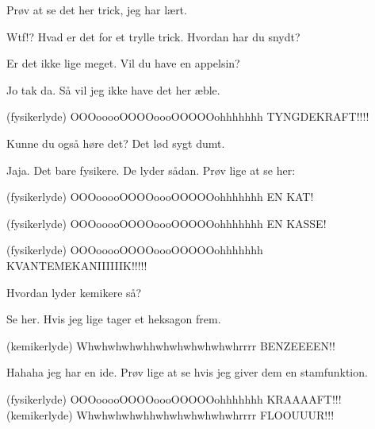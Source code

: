 \documentclass[a4paper,11pt]{article}
\begin{document}
\begin{sketch}


 Prøv at se det her trick, jeg har lært.


 Wtf!? Hvad er det for et trylle trick. Hvordan har du snydt?

 Er det ikke lige meget. Vil du have en appelsin?

 Jo tak da. Så vil jeg ikke have det her æble.


 (fysikerlyde) OOOooooOOOOoooOOOOOohhhhhhh TYNGDEKRAFT!!!!

 Kunne du også høre det? Det lød sygt dumt.

 Jaja. Det bare fysikere. De lyder sådan. Prøv lige at se her:


 (fysikerlyde) OOOooooOOOOoooOOOOOohhhhhhh EN KAT!


 (fysikerlyde) OOOooooOOOOoooOOOOOohhhhhhh EN KASSE!


 (fysikerlyde) OOOooooOOOOoooOOOOOohhhhhhh KVANTEMEKANIIIIIIK!!!!!

 Hvordan lyder kemikere så?

 Se her. Hvis jeg lige tager et heksagon frem.


 (kemikerlyde) Whwhwhwhwhhwhwhwhwhwhwhrrrr BENZEEEEN!!

 Hahaha jeg har en ide. Prøv lige at se hvis jeg giver dem en stamfunktion.


 (fysikerlyde) OOOooooOOOOoooOOOOOohhhhhhh KRAAAAFT!!!
 (kemikerlyde) Whwhwhwhwhhwhwhwhwhwhwhrrrr FLOOUUUR!!!


\end{sketch}
\end{document}
